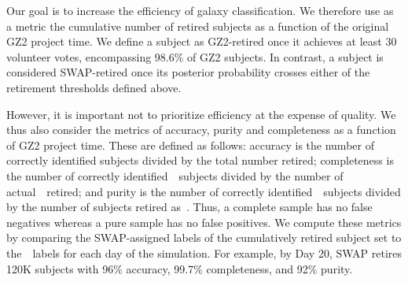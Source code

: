
Our goal is to increase the efficiency of galaxy classification. We therefore
 use as a metric the cumulative number of retired subjects
as a function of the original GZ2 project time.
We define a subject as GZ2-retired once it achieves at least 30 volunteer votes, 
encompassing 98.6\% of GZ2 subjects.
In contrast, a subject is considered SWAP-retired once its posterior 
probability crosses either of the retirement thresholds defined above. 


However, it is important not to prioritize efficiency at the expense of quality. 
We thus also consider the metrics of accuracy, 
purity and completeness as a function of GZ2 project time.  
These are defined as follows: accuracy is the number of correctly
identified subjects divided by the total number retired; completeness is the number of 
correctly identified~\feat~subjects divided by the number of actual~\feat~retired; 
and purity is the number of correctly identified~\feat~subjects divided by 
the number of subjects retired as~\feat. Thus, a complete sample has no false
negatives whereas a pure sample has no false positives. 
We compute these metrics by comparing the SWAP-assigned labels of the cumulatively 
retired subject set to the~\raw~labels for each day of the simulation. 
For example, by Day 20, SWAP retires 120K subjects with 96\% accuracy,
 99.7\% completeness, and 92\% purity. 

